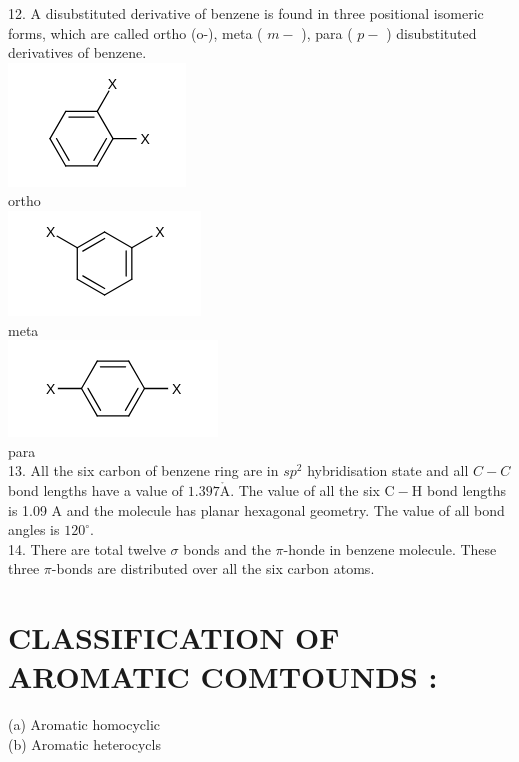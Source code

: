 \documentclass[10pt]{article}
\def\AA{\mathring{\mathrm{A}}}
\begin{document}
12. A disubstituted derivative of benzene is found in three positional isomeric forms, which are called ortho (o-), meta ( $m-$ ), para ( $p-$ ) disubstituted derivatives of benzene.\\
\includegraphics{smile-de85af3beb3f1741c4c273907d93aec4817ce2d2}\\
ortho\\
\includegraphics{smile-85e8ea8576681303b4a9707f3eace0fa2ff7c95d}\\
meta\\
\includegraphics{smile-00bb0e3ed2f84caf63a36e1f07382479fa05714f}\\
para\\
13. All the six carbon of benzene ring are in $s p^{2}$ hybridisation state and all $C-C$ bond lengths have a value of $1.397 \AA$. The value of all the six $\mathrm{C}-\mathrm{H}$ bond lengths is 1.09 A and the molecule has planar hexagonal geometry. The value of all bond angles is $120^{\circ}$.\\
14. There are total twelve $\sigma$ bonds and the $\pi$-honde in benzene molecule. These three $\pi$-bonds are distributed over all the six carbon atoms.

\section*{CLASSIFICATION OF AROMATIC COMTOUNDS :}
(a) Aromatic homocyclic\\
(b) Aromatic heterocycls
\end{document}
